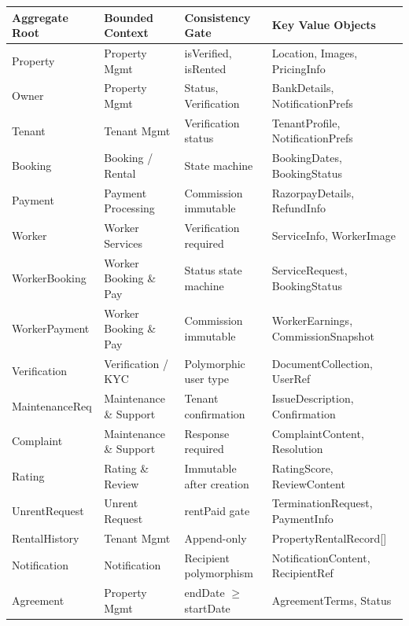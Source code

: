 \documentclass[12pt,a4paper]{article}
\begin{document}
\begin{tcolorbox}[enhanced, colback=ctxBlue!20!white, colframe=primary,
  arc=4pt, boxrule=0.8pt, title={\textbf{Aggregate Design Summary — All 16 Aggregates}}]
\begin{tabular}{@{}p{2.8cm}p{3cm}p{3.5cm}p{4.2cm}@{}}
\toprule
\textbf{Aggregate Root} & \textbf{Bounded Context} & \textbf{Consistency Gate} & \textbf{Key Value Objects} \\
\midrule
Property & Property Mgmt & isVerified, isRented & Location, Images, PricingInfo \\
Owner & Property Mgmt & Status, Verification & BankDetails, NotificationPrefs \\
Tenant & Tenant Mgmt & Verification status & TenantProfile, NotificationPrefs \\
Booking & Booking / Rental & State machine & BookingDates, BookingStatus \\
Payment & Payment Processing & Commission immutable & RazorpayDetails, RefundInfo \\
Worker & Worker Services & Verification required & ServiceInfo, WorkerImage \\
WorkerBooking & Worker Booking \& Pay & Status state machine & ServiceRequest, BookingStatus \\
WorkerPayment & Worker Booking \& Pay & Commission immutable & WorkerEarnings, CommissionSnapshot \\
Verification & Verification / KYC & Polymorphic user type & DocumentCollection, UserRef \\
MaintenanceReq & Maintenance \& Support & Tenant confirmation & IssueDescription, Confirmation \\
Complaint & Maintenance \& Support & Response required & ComplaintContent, Resolution \\
Rating & Rating \& Review & Immutable after creation & RatingScore, ReviewContent \\
UnrentRequest & Unrent Request & rentPaid gate & TerminationRequest, PaymentInfo \\
RentalHistory & Tenant Mgmt & Append-only & PropertyRentalRecord[] \\
Notification & Notification & Recipient polymorphism & NotificationContent, RecipientRef \\
Agreement & Property Mgmt & endDate $\geq$ startDate & AgreementTerms, Status \\
\bottomrule
\end{tabular}
\end{tcolorbox}
\end{document}
